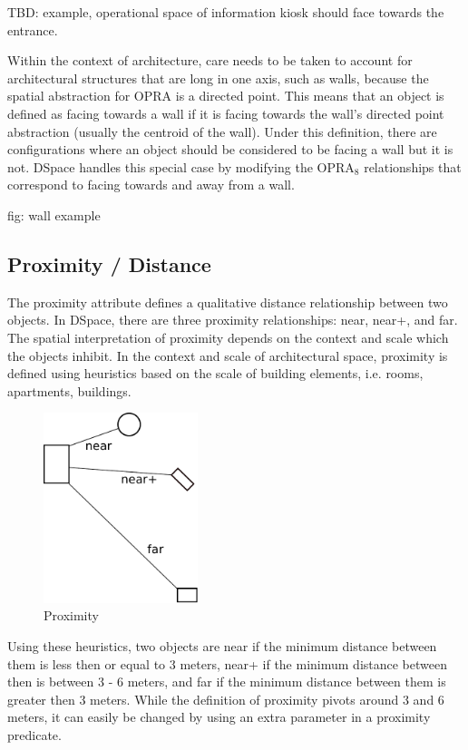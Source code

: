\documentclass[12pt]{ucthesis}
\begin{document}
TBD: example, operational space of information kiosk should face towards the entrance.

Within the context of architecture, care needs to be taken to account for architectural structures that are long in one axis, such as walls, because the spatial abstraction for OPRA is a directed point. This means that an object is defined as facing towards a wall if it is facing towards the wall's directed point abstraction (usually the centroid of the wall). Under this definition, there are configurations where an object should be considered to be facing a wall but it is not. DSpace handles this special case by modifying the OPRA$_{8}$ relationships that correspond to facing towards and away from a wall. 

fig: wall example

\subsection{Proximity / Distance}
The proximity attribute defines a qualitative distance relationship between two objects. In DSpace, there are three proximity relationships: near, near+, and far. The spatial interpretation of proximity depends on the context and scale which the objects inhibit. In the context and scale of architectural space, proximity is defined using heuristics based on the scale of building elements, i.e. rooms, apartments, buildings.

\begin{figure}[H]
\centering
\includegraphics[width=45mm]{proximity}
\caption{Proximity}
\label{proximity}
\end{figure}

Using these heuristics, two objects are near if the minimum distance between them is less then or equal to 3 meters, near+ if the minimum distance between then is between 3 - 6 meters, and far if the minimum distance between them is greater then 3 meters. While the definition of proximity pivots around 3 and 6 meters, it can easily be changed by using an extra parameter in a proximity predicate. 
\end{document}
